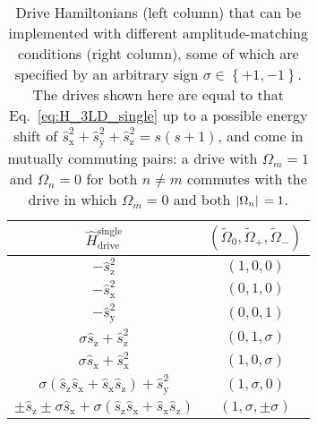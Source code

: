 \documentclass[aps,pra,nofootinbib,twocolumn,superscriptaddress]{revtex4-2}
\renewcommand{\t}{\text} %
\newcommand{\p}[1]{\left(#1\right)} %
\renewcommand{\set}[1]{\left\{#1\right\}} %
\newcommand{\1}{\mathds{1}}
\newcommand{\s}{\hat s}
\renewcommand{\H}{\hat H}
\newcommand{\x}{\text{x}}
\newcommand{\y}{\text{y}}
\newcommand{\z}{\text{z}}
\begin{document}
\begin{table}
\centering
\caption{
Drive Hamiltonians (left column) that can be implemented with different amplitude-matching conditions (right column), some of which are specified by an arbitrary sign $\sigma\in\set{+1,-1}$.
The drives shown here are equal to that Eq.~\eqref{eq:H_3LD_single} up to a possible energy shift of $\s_\x^2+\s_\y^2+\s_\z^2=s(s+1)$, and come in mutually commuting pairs: a drive with $\Omega_m=1$ and $\Omega_n=0$ for both $n\ne m$ commutes with the drive in which $\Omega_m=0$ and both $\abs*{\Omega_n}=1$.
}
\vspace{.5em}
\begin{tabular}{c|c}
  $\H_{\t{drive}}^{\t{single}}$
  & $(\tilde\Omega_0,\tilde\Omega_+,\tilde\Omega_-)$
  \\ \hline\hline
  $-\s_\z^2$ & $\p{1,0,0}$
  \\ \hline
   $-\s_\x^2$ & $\p{0,1,0}$
  \\ \hline
  $-\s_\y^2$ & $\p{0,0,1}$
  \\ \hline
  $\sigma \s_\z + \s_\z^2$ & $\p{0,1,\sigma}$
  \\ \hline
  $\sigma \s_\x + \s_\x^2$ & $\p{1,0,\sigma}$
  \\ \hline
  $\sigma\p{\s_\z \s_\x+\s_\x \s_\z} + \s_\y^2$ & $\p{1,\sigma,0}$
  \\ \hline
  $\pm \s_\z \pm \sigma \s_\x + \sigma (\s_\z \s_\x + \s_\x \s_\z)$
  & $\p{1,\sigma,\pm\sigma}$
\end{tabular}
\label{tab:drives}
\end{table}
\end{document}
